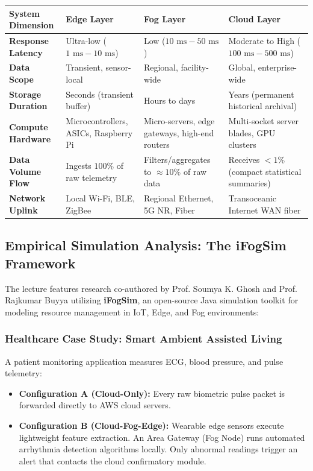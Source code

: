 \begin{center}
\begin{tabularx}{\textwidth}{>{\bfseries}l X X X}
\toprule
System Dimension & Edge Layer & Fog Layer & Cloud Layer\\
\midrule
Response Latency & Ultra-low ($1\text{ ms} - 10\text{ ms}$) & Low ($10\text{ ms} - 50\text{ ms}$) & Moderate to High ($100\text{ ms} - 500\text{ ms}$)\\
Data Scope & Transient, sensor-local & Regional, facility-wide & Global, enterprise-wide\\
Storage Duration & Seconds (transient buffer) & Hours to days & Years (permanent historical archival)\\
Compute Hardware & Microcontrollers, ASICs, Raspberry Pi & Micro-servers, edge gateways, high-end routers & Multi-socket server blades, GPU clusters\\
Data Volume Flow & Ingests $100\%$ of raw telemetry & Filters/aggregates to $\approx 10\%$ of raw data & Receives $< 1\%$ (compact statistical summaries)\\
Network Uplink & Local Wi-Fi, BLE, ZigBee & Regional Ethernet, 5G NR, Fiber & Transoceanic Internet WAN fiber\\
\bottomrule
\end{tabularx}
\end{center}

\subsection{Empirical Simulation Analysis: The iFogSim Framework}
The lecture features research co-authored by Prof. Soumya K. Ghosh and Prof. Rajkumar Buyya utilizing \textbf{iFogSim}, an open-source Java simulation toolkit for modeling resource management in IoT, Edge, and Fog environments:

\subsubsection{Healthcare Case Study: Smart Ambient Assisted Living}
A patient monitoring application measures ECG, blood pressure, and pulse telemetry:
\begin{itemize}[leftmargin=*]
  \item \textbf{Configuration A (Cloud-Only):} Every raw biometric pulse packet is forwarded directly to AWS cloud servers.
  \item \textbf{Configuration B (Cloud-Fog-Edge):} Wearable edge sensors execute lightweight feature extraction. An Area Gateway (Fog Node) runs automated arrhythmia detection algorithms locally. Only abnormal readings trigger an alert that contacts the cloud confirmatory module.
\end{itemize}

